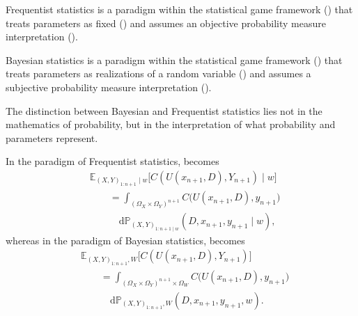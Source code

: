 \begin{definition}
	\label{def:frequentist_statistics}
	Frequentist statistics is a paradigm within the statistical game framework () that treats parameters as fixed () and assumes an objective probability measure interpretation ().
\end{definition}

\begin{definition}
	\label{def:bayesian_statistics}
	Bayesian statistics is a paradigm within the statistical game framework () that treats parameters as realizations of a random variable () and assumes a subjective probability measure interpretation ().
\end{definition}


\begin{remark}[Inference]
	The distinction between Bayesian and Frequentist statistics lies not in the mathematics of probability, but in the interpretation of what probability and parameters represent.
\end{remark}

\begin{remark}
	\label{rem:frequentist_bayesian_expected_cost}
	In the paradigm of Frequentist statistics,  becomes
	\begin{equation}
		\begin{split}
			&\mathbb{E}_{(X,Y)_{1\colon n+1}\mid w}\big[C(U(x_{n+1},D),Y_{n+1})\mid w\big] \\
			&\qquad= \int_{(\Omega_X\times\Omega_Y)^{n+1}}
			C\big(U(x_{n+1},D),y_{n+1}\big)\\
			&\qquad\quad \mathrm{d}\mathbb{P}_{(X,Y)_{1\colon n+1\mid w}}(D,x_{n+1},y_{n+1}\mid w),
		\end{split}
		\label{eq:expcost5}
	\end{equation}
 	whereas in the paradigm of Bayesian statistics,  becomes
 	\begin{equation}
 		\begin{split}
 			&\mathbb{E}_{(X,Y)_{1\colon n+1},W}\big[C(U(x_{n+1},D),Y_{n+1})\big] \\
 			&\qquad= \int_{(\Omega_X\times\Omega_Y)^{n+1}\times\Omega_W}
 			C\big(U(x_{n+1},D),y_{n+1}\big)\\
 			&\qquad\quad
 			\mathrm{d}\mathbb{P}_{(X,Y)_{1\colon n+1},W }(D,x_{n+1},y_{n+1},w).
 		\end{split}
 		\label{eq:expcost6}
 	\end{equation}
\end{remark}



